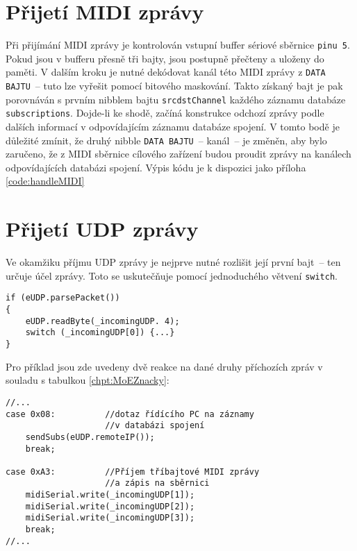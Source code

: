 \section{Přijetí \acs{MIDI} zprávy}\label{chpt:PrijMIDI}
Při přijímání \acs{MIDI} zprávy je kontrolován vstupní buffer sériové sběrnice \texttt{pinu 5}. Pokud jsou v bufferu přesně tři bajty, jsou postupně přečteny a uloženy do paměti. V dalším kroku je nutné dekódovat kanál této \acs{MIDI} zprávy z \texttt{DATA BAJTU}~-- tuto  lze vyřešit pomocí bitového maskování. Takto získaný bajt je pak porovnáván s prvním nibblem bajtu \texttt{srcdstChannel} každého záznamu databáze \texttt{sub\-scrip\-tions}. Dojde-li ke shodě, začíná konstrukce odchozí zprávy podle dalších informací v odpovídajícím záznamu databáze spojení. V tomto bodě je důležité zmínit, že druhý nibble \texttt{DATA BAJTU}~-- kanál~-- je změněn, aby bylo zaručeno, že z \acs{MIDI} sběrnice cílového zařízení budou proudit zprávy na kanálech odpovídajících databázi spojení. Výpis kódu je k dispozici jako příloha \ref{code:handleMIDI}

\section{Přijetí UDP zprávy}
Ve okamžiku příjmu \acs{UDP} zprávy je nejprve nutné rozlišit její první bajt~-- ten určuje účel zprávy. Toto se uskutečňuje pomocí jednoduchého větvení \texttt{switch}.
\begin{lstlisting}
if (eUDP.parsePacket())
{
    eUDP.readByte(_incomingUDP. 4);
    switch (_incomingUDP[0]) {...}
}
\end{lstlisting}

Pro příklad jsou zde uvedeny dvě reakce na dané druhy příchozích zpráv v souladu s tabulkou \ref{chpt:MoEZnacky}:
\begin{lstlisting}
//...
case 0x08:          //dotaz řídícího PC na záznamy 
                    //v databázi spojení
    sendSubs(eUDP.remoteIP());
    break;

case 0xA3:          //Příjem tříbajtové MIDI zprávy 
                    //a zápis na sběrnici
    midiSerial.write(_incomingUDP[1]);
    midiSerial.write(_incomingUDP[2]);
    midiSerial.write(_incomingUDP[3]);
    break;
//...
\end{lstlisting}
